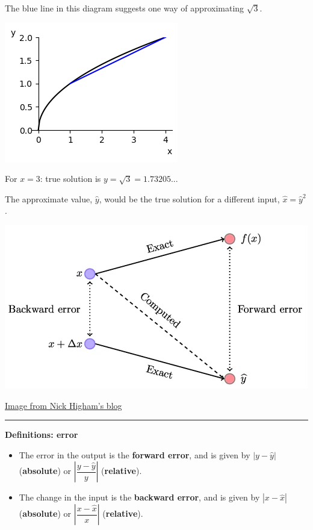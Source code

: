 \documentclass[12pt,letterpaper,noanswers]{exam}
\begin{document}
The blue line in this diagram suggests one way of approximating $\sqrt{3}$.

\includegraphics{img/C01linearsqrtapprox.png}





\noindent For $x = 3$: true solution is $y = \sqrt{3} = 1.73205...$


\noindent The approximate value, $\hat{y}$, would be the true solution for a different input, $\hat{x} = \hat{y}^2$.


\includegraphics[scale=0.6]{img/C01errorNickHingham.png}

\href{https://nhigham.com/2020/03/25/what-is-backward-error/}{Image from Nick Higham's blog}

\vspace{0.2cm}
\hrule
\vspace{0.2cm}

\noindent \textbf{Definitions: error}

\begin{tcolorbox}
\begin{itemize}
\itemsep0pt
\item The error in the output is the \textbf{forward error}, and is given by $\left\vert y - \hat{y}\right\vert$ (\textbf{absolute}) or $\left\vert \dfrac{y - \hat{y}}{y}\right\vert$ (\textbf{relative}).
\item The change in the input is the \textbf{backward error}, and is given by $\left\vert x - \hat{x}\right\vert$ (\textbf{absolute}) or $\left\vert \dfrac{x - \hat{x}}{x}\right\vert$ (\textbf{relative}).
\end{itemize}
\end{tcolorbox}
\end{document}
